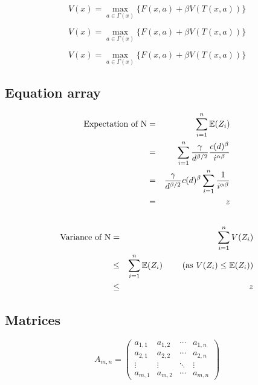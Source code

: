 \documentclass{article}
\begin{document}
$$
    V(x) = \max_{a \in \Gamma (x) } \{ F(x,a) + \beta V(T(x,a)) \}  \label{eq:bellman}
$$

\[
    V(x) = \max_{a \in \Gamma (x) } \{ F(x,a) + \beta V(T(x,a)) \}  \label{eq:bellman}
\]

\begin{equation}
    V(x) = \max_{a \in \Gamma (x) } \{ F(x,a) + \beta V(T(x,a)) \}  \label{eq:bellman}
\end{equation}


\subsection{Equation array}\label{subsec:eqarray}

\begin{eqnarray*}
    \mbox{Expectation of N} & = & \sum_{i=1}^{n} \mathbb{E}(Z_i) \\
                            & = & \sum_{i=1}^{n} \frac{\gamma}{d^{\beta/2}} \frac{ c(d)^\beta }{i^{\alpha\beta}} \\
                            & = & \frac{\gamma}{d^{\beta/2}} c(d)^\beta \sum_{i=1}^{n} \frac{1}{i^{\alpha\beta}} \\
                            & = & z \\
                            & ~ & \\
\end{eqnarray*}
\begin{eqnarray}
    \mbox{Variance of N} & = & \sum_{i=1}^{n} V(Z_i) \\
                         & \leq & \sum_{i=1}^{n} \mathbb{E}(Z_i) ~~~~~~~ (\mbox{as } V(Z_i) \leq \mathbb{E}(Z_i)) \\
                         & \leq & z  \nonumber
\end{eqnarray}


\subsection{Matrices}\label{subsec:matrices}

$$
    A_{m,n} =
    \begin{pmatrix}
        a_{1,1} & a_{1,2} & \cdots & a_{1,n} \\
        a_{2,1} & a_{2,2} & \cdots & a_{2,n} \\
        \vdots  & \vdots  & \ddots & \vdots  \\
        a_{m,1} & a_{m,2} & \cdots & a_{m,n}
    \end{pmatrix}
$$
\end{document}
